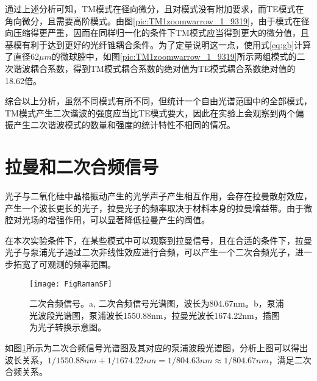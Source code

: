 通过上述分析可知，TM模式在径向微分，且对模式没有附加要求，而TE模式在角向微分，且需要高阶模式。由图\ref{pic:TM1zoomwarrow_1_9319}，由于模式在径向压缩得更严重，因而在同样归一化的条件下TM模式应当得到更大的微分值，且基模有利于达到更好的光纤锥耦合条件。为了定量说明这一点，使用式\ref{eq:gb}计算了直径62$\mu m$的微球腔中，如图\ref{pic:TM1zoomwarrow_1_9319}所示两组模式的二次谐波耦合系数，得到TM模式耦合系数的绝对值为TE模式耦合系数绝对值的18.62倍。

综合以上分析，虽然不同模式有所不同，但统计一个自由光谱范围中的全部模式，TM模式产生二次谐波的强度应当比TE模式要大，因此在实验上会观察到两个偏振产生二次谐波模式的数量和强度的统计特性不相同的情况。


\section{拉曼和二次合频信号}


光子与二氧化硅中晶格振动产生的光学声子产生相互作用，会存在拉曼散射效应\cite{boyd2003nonlinear}，产生一个波长更长的光子，拉曼光子的频率取决于材料本身的拉曼增益带。由于微腔对光场的增强作用，可以显著降低拉曼产生的阈值\cite{spillane2002ultralow, cai2000fiber, kippenberg2004ultralow}。 

在本次实验条件下，在某些模式中可以观察到拉曼信号，且在合适的条件下，拉曼光子与泵浦光子通过二次非线性效应进行合频，可以产生一个二次合频光子，进一步拓宽了可观测的频率范围。

\begin{figure}
\centering
\texttt{[image: FigRamanSF]}
\caption{二次合频信号。a, 二次合频信号光谱图，波长为804.67nm。b，泵浦光波段光谱图，泵浦波长1550.88nm，拉曼光波长1674.22nm，插图为光子转换示意图。}
\label{pic:FigRamanSF}
\end{figure}

如图\ref{pic:FigRamanSF}所示为二次合频信号光谱图及其对应的泵浦波段光谱图，分析上图可以得出波长关系，$1/1550.88nm+1/1674.22nm = 1/804.63nm \approx 1/804.67nm$，满足二次合频关系。
